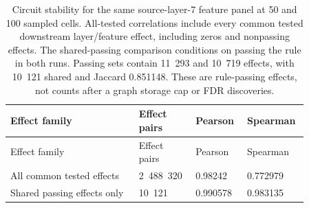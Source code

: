 \begin{longtable}{@{}L{0.4\linewidth}L{0.16\linewidth}L{0.15\linewidth}L{0.15\linewidth}@{}}
\caption{Circuit stability for the same source-layer-7 feature panel at 50 and 100 sampled cells. All-tested correlations include every common tested downstream layer/feature effect, including zeros and nonpassing effects. The shared-passing comparison conditions on passing the rule in both runs. Passing sets contain 11~293 and 10~719 effects, with 10~121 shared and Jaccard 0.851148. These are rule-passing effects, not counts after a graph storage cap or FDR discoveries.}\\
\toprule
Effect family & Effect pairs & Pearson & Spearman \\
\midrule
\endfirsthead
\toprule
Effect family & Effect pairs & Pearson & Spearman \\
\midrule
\endhead
\endfoot
\bottomrule
\endlastfoot
All common tested effects & 2~488~320 & 0.98242 & 0.772979 \\
Shared passing effects only & 10~121 & 0.990578 & 0.983135 \\
\end{longtable}
